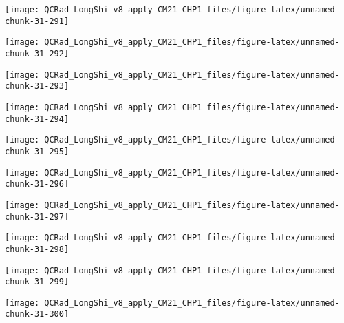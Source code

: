 \documentclass[
  10pt,
  a4paper,oneside]{article}
\begin{document}
\begin{center}\texttt{[image: QCRad\_LongShi\_v8\_apply\_CM21\_CHP1\_files/figure-latex/unnamed-chunk-31-291]} \end{center}

\begin{center}\texttt{[image: QCRad\_LongShi\_v8\_apply\_CM21\_CHP1\_files/figure-latex/unnamed-chunk-31-292]} \end{center}

\begin{center}\texttt{[image: QCRad\_LongShi\_v8\_apply\_CM21\_CHP1\_files/figure-latex/unnamed-chunk-31-293]} \end{center}

\begin{center}\texttt{[image: QCRad\_LongShi\_v8\_apply\_CM21\_CHP1\_files/figure-latex/unnamed-chunk-31-294]} \end{center}

\begin{center}\texttt{[image: QCRad\_LongShi\_v8\_apply\_CM21\_CHP1\_files/figure-latex/unnamed-chunk-31-295]} \end{center}

\begin{center}\texttt{[image: QCRad\_LongShi\_v8\_apply\_CM21\_CHP1\_files/figure-latex/unnamed-chunk-31-296]} \end{center}

\begin{center}\texttt{[image: QCRad\_LongShi\_v8\_apply\_CM21\_CHP1\_files/figure-latex/unnamed-chunk-31-297]} \end{center}

\begin{center}\texttt{[image: QCRad\_LongShi\_v8\_apply\_CM21\_CHP1\_files/figure-latex/unnamed-chunk-31-298]} \end{center}

\begin{center}\texttt{[image: QCRad\_LongShi\_v8\_apply\_CM21\_CHP1\_files/figure-latex/unnamed-chunk-31-299]} \end{center}

\begin{center}\texttt{[image: QCRad\_LongShi\_v8\_apply\_CM21\_CHP1\_files/figure-latex/unnamed-chunk-31-300]} \end{center}
\end{document}
